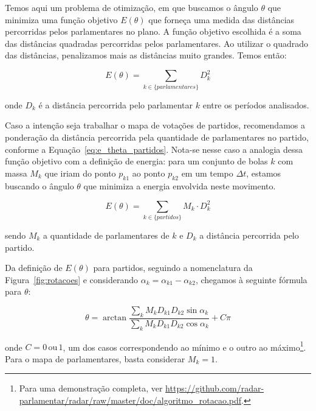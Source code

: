 \documentclass[
	article,			%
	12pt,				%
	oneside,			%
	a4paper,			%
	english,			%
	brazil,				%
	sumario=tradicional,
	oldfontcommands %
	]{abntex2}
\begin{document}
Temos aqui um problema de otimização, em que buscamos o ângulo $\theta$ que minimiza uma função objetivo $E(\theta)$ que forneça uma medida das distâncias percorridas pelos parlamentares no plano. A função objetivo escolhida é a soma das distâncias quadradas percorridas pelos parlamentares. Ao utilizar o quadrado das distâncias, penalizamos mais as distâncias muito grandes. Temos então:

\begin{equation}
E(\theta)=\sum_{k\in\{parlamentares\}} D_{k}^{2}
\label{eq:e_theta}
\end{equation}

onde $D_{k}$ é a distância percorrida pelo parlamentar $k$ entre os períodos analisados.

Caso a intenção seja trabalhar o mapa de votações de partidos, recomendamos a ponderação da distância percorrida pela quantidade de parlamentares no partido, conforme a Equação~\ref{eq:e_theta_partidos}. Nota-se nesse caso a analogia dessa função objetivo com a definição de energia: para um conjunto de bolas $k$ com massa $M_{k}$ que iriam do ponto $p_{k1}$ ao ponto $p_{k2}$ em um tempo $\Delta t$, estamos buscando o ângulo $\theta$ que minimiza a energia envolvida neste movimento. 

\begin{equation}
E(\theta)=\sum_{k\in\{partidos\}}M_{k}\cdot D_{k}^{2}
\label{eq:e_theta_partidos}
\end{equation}

sendo $M_{k}$ a quantidade de parlamentares de $k$ e $D_{k}$ a distância percorrida pelo partido.


Da definição de $E(\theta)$ para partidos, seguindo a nomenclatura da Figura~\ref{fig:rotacoes} e considerando $\alpha_k = \alpha_{k1} - \alpha_{k2}$, chegamos à seguinte fórmula para $\theta$:

\begin{equation}
\theta=\arctan\frac{\sum_{k}M_{k}D_{k1}D_{k2}\sin\alpha_{k}}{\sum_{k}M_{k}D_{k1}D_{k2}\cos\alpha_{k}}+C\pi
\label{eq:theta}
\end{equation}

onde $C=0\mathrm{\, ou}\,1$, um dos casos correspondendo ao mínimo e o outro ao máximo\footnote{Para uma demonstração completa, ver \url{https://github.com/radar-parlamentar/radar/raw/master/doc/algoritmo_rotacao.pdf}.}. Para o mapa de parlamentares, basta considerar $M_{k} = 1$.
\end{document}
